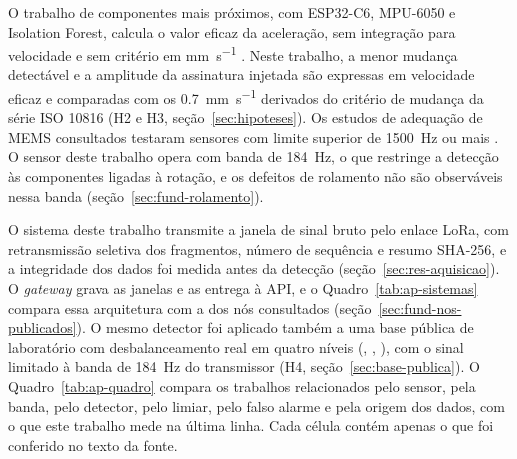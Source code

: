 O trabalho de componentes mais próximos, com ESP32-C6, MPU-6050 e Isolation Forest, calcula o valor eficaz da aceleração, sem integração para velocidade e sem critério em \si{\milli\meter\per\second} \cite{kolok2025}. Neste trabalho, a menor mudança detectável e a amplitude da assinatura injetada são expressas em velocidade eficaz e comparadas com os \SI{0,7}{\milli\meter\per\second} derivados do critério de mudança da série ISO 10816 (H2 e H3, seção~\ref{sec:hipoteses}). Os estudos de adequação de MEMS consultados testaram sensores com limite superior de \SI{1500}{\hertz} ou mais \cite{albarbar2008,fidali2024}. O sensor deste trabalho opera com banda de \SI{184}{\hertz}, o que restringe a detecção às componentes ligadas à rotação, e os defeitos de rolamento não são observáveis nessa banda (seção~\ref{sec:fund-rolamento}).

O sistema deste trabalho transmite a janela de sinal bruto pelo enlace LoRa, com retransmissão seletiva dos fragmentos, número de sequência e resumo SHA-256, e a integridade dos dados foi medida antes da detecção (seção~\ref{sec:res-aquisicao}). O \textit{gateway} grava as janelas e as entrega à API, e o Quadro~\ref{tab:ap-sistemas} compara essa arquitetura com a dos nós consultados (seção~\ref{sec:fund-nos-publicados}). O mesmo detector foi aplicado também a uma base pública de laboratório com desbalanceamento real em quatro níveis (, \citeyear{mey2020}, \citeyear{mey2022dados}), com o sinal limitado à banda de \SI{184}{\hertz} do transmissor (H4, seção~\ref{sec:base-publica}). O Quadro~\ref{tab:ap-quadro} compara os trabalhos relacionados pelo sensor, pela banda, pelo detector, pelo limiar, pelo falso alarme e pela origem dos dados, com o que este trabalho mede na última linha. Cada célula contém apenas o que foi conferido no texto da fonte.

